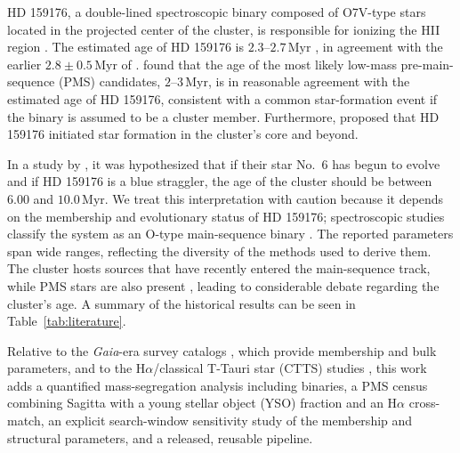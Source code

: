 \documentclass{aa}
\begin{document}
HD 159176, a double-lined spectroscopic binary composed of O7V-type stars located in the projected center of the cluster, is responsible for ionizing the HII region \citep{2016ApJ...832..211P}. The estimated age of HD 159176 is $2.3$--$2.7\,\mathrm{Myr}$ \citep{2010AA...511A..25R}, in agreement with the earlier $2.8\pm0.5\,\mathrm{Myr}$ of \citet{1978MNRAS.182..607F}\@. \citet{2010AA...511A..25R} found that the age of the most likely low-mass pre-main-sequence (PMS) candidates, $2$--$3\,\mathrm{Myr}$, is in reasonable agreement with the estimated age of HD 159176, consistent with a common star-formation event if the binary is assumed to be a cluster member. Furthermore, \citet{1978MNRAS.182..607F} proposed that HD 159176 initiated star formation in the cluster's core and beyond.

In a study by \citet{2018AA...610A..30A}, it was hypothesized that if their star No.~6 has begun to evolve and if HD 159176 is a blue straggler, the age of the cluster should be between $6.00$ and $10.0\,\mathrm{Myr}$. We treat this interpretation with caution because it depends on the membership and evolutionary status of HD 159176; spectroscopic studies classify the system as an O-type main-sequence binary \citep{1993Obs...113..204S,2007A&A...474..193L,2016ApJ...832..211P}. The reported parameters span wide ranges, reflecting the diversity of the methods used to derive them. The cluster hosts sources that have recently entered the main-sequence track, while PMS stars are also present \citep{2019MNRAS.484.5102K}, leading to considerable debate regarding the cluster's age. A summary of the historical results can be seen in Table~\ref{tab:literature}.

Relative to the \textit{Gaia}-era survey catalogs \citep{2020AA...640A...1C,2022ApJS..262....7H,2024arXiv240305143H}, which provide membership and bulk parameters, and to the H$\alpha$/classical T-Tauri star (CTTS) studies \citep{2010AA...511A..25R,2019MNRAS.484.5102K}, this work adds a quantified mass-segregation analysis including binaries, a PMS census combining Sagitta with a young stellar object (YSO) fraction and an H$\alpha$ cross-match, an explicit search-window sensitivity study of the membership and structural parameters, and a released, reusable pipeline.
\end{document}
